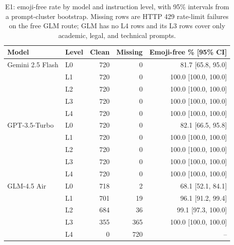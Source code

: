 \begin{table}[t]
\centering

\caption{E1: emoji-free rate by model and instruction level, with 95\% intervals from a prompt-cluster bootstrap. Missing rows are HTTP 429 rate-limit failures on the free GLM route; GLM has no L4 rows and its L3 rows cover only academic, legal, and technical prompts.}
\label{tab:study1-model-level}
\begin{tabular}{llrrr}
\toprule
Model & Level & Clean & Missing & Emoji-free \% [95\% CI] \\
\midrule
Gemini 2.5 Flash & L0 & 720 & 0 & 81.7 [65.8, 95.0] \\
 & L1 & 720 & 0 & 100.0 [100.0, 100.0] \\
 & L2 & 720 & 0 & 100.0 [100.0, 100.0] \\
 & L3 & 720 & 0 & 100.0 [100.0, 100.0] \\
 & L4 & 720 & 0 & 100.0 [100.0, 100.0] \\
GPT-3.5-Turbo & L0 & 720 & 0 & 82.1 [66.5, 95.8] \\
 & L1 & 720 & 0 & 100.0 [100.0, 100.0] \\
 & L2 & 720 & 0 & 100.0 [100.0, 100.0] \\
 & L3 & 720 & 0 & 100.0 [100.0, 100.0] \\
 & L4 & 720 & 0 & 100.0 [100.0, 100.0] \\
GLM-4.5 Air & L0 & 718 & 2 & 68.1 [52.1, 84.1] \\
 & L1 & 701 & 19 & 96.1 [91.2, 99.4] \\
 & L2 & 684 & 36 & 99.1 [97.3, 100.0] \\
 & L3 & 355 & 365 & 100.0 [100.0, 100.0] \\
 & L4 & 0 & 720 & -- \\
\bottomrule
\end{tabular}
\end{table}
